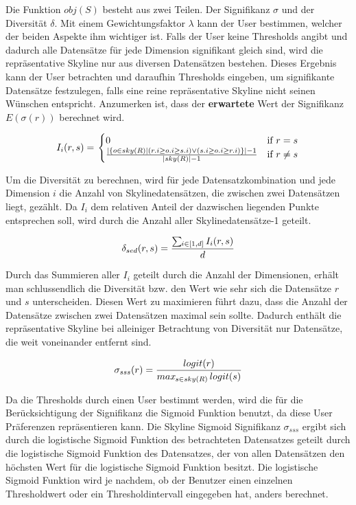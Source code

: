 Die Funktion $obj(S)$ besteht aus zwei Teilen. Der Signifikanz $\sigma$ und der Diversität $\delta$.
Mit einem Gewichtungsfaktor $\lambda$ kann der User bestimmen, welcher der beiden Aspekte ihm wichtiger ist. 
Falls der User keine Thresholds angibt und dadurch alle Datensätze für jede Dimension signifikant gleich sind, wird die repräsentative Skyline nur aus diversen Datensätzen bestehen. Dieses Ergebnis kann der User betrachten und daraufhin Thresholds eingeben, um signifikante Datensätze festzulegen, falls eine reine repräsentative Skyline nicht seinen Wünschen entspricht.  Anzumerken ist, dass der \textbf{erwartete} Wert der Signifikanz $E(\sigma(r))$ berechnet wird. 

$$\begin{displaystyle}
  I_i(r, s) = \left.
  \begin{cases}
    0 & \text{if } r=s \\
    \frac{|\{o \in{sky(R)}| (r.i \geq o.i \geq s.i) \lor (s.i \geq o.i \geq r.i)\}|-1}{|sky(R)|-1} & \text{if } r \neq s
  \end{cases}
  \right.
\end{displaystyle}$$

Um die Diversität zu berechnen, wird für jede Datensatzkombination und jede Dimension $i$ die Anzahl von Skylinedatensätzen, die zwischen zwei Datensätzen liegt, gezählt. Da $I_i$ dem relativen Anteil der dazwischen liegenden Punkte entsprechen soll, wird durch die Anzahl aller Skylinedatensätze-1 geteilt.

$$\delta_{sed}(r,s)=\frac{\sum\limits\mathop{}_{\mkern-5mu i \in{[1,d]}} I_i(r,s)}{d}$$

Durch das Summieren aller $I_i$ geteilt durch die Anzahl der Dimensionen, erhält man schlussendlich die Diversität bzw. den Wert wie sehr sich die Datensätze $r$ und $s$ unterscheiden. Diesen Wert zu maximieren führt dazu, dass die Anzahl der Datensätze zwischen zwei Datensätzen maximal sein sollte. Dadurch enthält die repräsentative Skyline bei alleiniger Betrachtung von Diversität nur Datensätze, die weit voneinander entfernt sind. 

$$\sigma_{sss}(r)=\frac{logit(r)}{max\mathop{}_{\mkern-5mu s \in{sky(R)}}logit(s)}$$

Da die Thresholds durch einen User bestimmt werden, wird die für die Berücksichtigung der Signifikanz die Sigmoid Funktion benutzt, da diese User Präferenzen repräsentieren kann. Die Skyline Sigmoid Signifikanz $\sigma_{sss}$ ergibt sich durch die logistische Sigmoid Funktion des betrachteten Datensatzes geteilt durch die logistische Sigmoid Funktion des Datensatzes, der von allen Datensätzen den höchsten Wert für die logistische Sigmoid Funktion besitzt. Die logistische Sigmoid Funktion wird je nachdem, ob der Benutzer einen einzelnen Thresholdwert oder ein Thresholdintervall eingegeben hat, anders berechnet.


